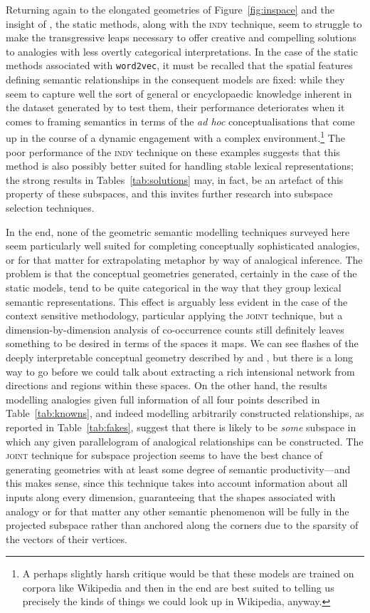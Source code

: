 Returning again to the elongated geometries of Figure~\ref{fig:inspace} and the insight of \cite{Linzen2016}, the static methods, along with the \textsc{indy} technique, seem to struggle to make the transgressive leaps necessary to offer creative and compelling solutions to analogies with less overtly categorical interpretations.  In the case of the static methods associated with \texttt{word2vec}, it must be recalled that the spatial features defining semantic relationships in the consequent models are fixed: while they seem to capture well the sort of general or encyclopaedic knowledge inherent in the dataset generated by \cite{MikolovEA2013} to test them, their performance deteriorates when it comes to framing semantics in terms of the \emph{ad hoc} conceptualisations that come up in the course of a dynamic engagement with a complex environment.\footnote{A perhaps slightly harsh critique would be that these models are trained on corpora like Wikipedia and then in the end are best suited to telling us precisely the kinds of things we could look up in Wikipedia, anyway.}  The poor performance of the \textsc{indy} technique on these examples suggests that this method is also possibly better suited for handling stable lexical representations; the strong results in Tables~\ref{tab:solutions} may, in fact, be an artefact of this property of these subspaces, and this invites further research into subspace selection techniques.

In the end, none of the geometric semantic modelling techniques surveyed here seem particularly well suited for completing conceptually sophisticated analogies, or for that matter for extrapolating metaphor by way of analogical inference.  The problem is that the conceptual geometries generated, certainly in the case of the static models, tend to be quite categorical in the way that they group lexical semantic representations.  This effect is arguably less evident in the case of the context sensitive methodology, particular applying the \textsc{joint} technique, but a dimension-by-dimension analysis of co-occurrence counts still definitely leaves something to be desired in terms of the spaces it maps.  We can see flashes of the deeply interpretable conceptual geometry described by \cite{Gardenfors2000} and \cite{Widdows2004}, but there is a long way to go before we could talk about extracting a rich intensional network from directions and regions within these spaces.  On the other hand, the results modelling analogies given full information of all four points described in Table~\ref{tab:knowns}, and indeed modelling arbitrarily constructed relationships, as reported in Table~\ref{tab:fakes}, suggest that there is likely to be \emph{some} subspace in which any given parallelogram of analogical relationships can be constructed.  The \textsc{joint} technique for subspace projection seems to have the best chance of generating geometries with at least some degree of semantic productivity---and this makes sense, since this technique takes into account information about all inputs along every dimension, guaranteeing that the shapes associated with analogy or for that matter any other semantic phenomenon will be fully in the projected subspace rather than anchored along the corners due to the sparsity of the vectors of their vertices.

